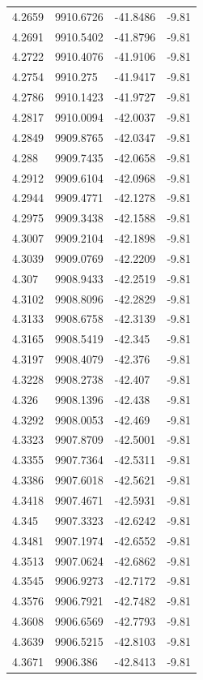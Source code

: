 \begin{table}[H]
\begin{tabular}{llll}
4.2659 & 9910.6726 & -41.8486 & -9.81 \\
4.2691 & 9910.5402 & -41.8796 & -9.81 \\
4.2722 & 9910.4076 & -41.9106 & -9.81 \\
4.2754 & 9910.275 & -41.9417 & -9.81 \\
4.2786 & 9910.1423 & -41.9727 & -9.81 \\
4.2817 & 9910.0094 & -42.0037 & -9.81 \\
4.2849 & 9909.8765 & -42.0347 & -9.81 \\
4.288 & 9909.7435 & -42.0658 & -9.81 \\
4.2912 & 9909.6104 & -42.0968 & -9.81 \\
4.2944 & 9909.4771 & -42.1278 & -9.81 \\
4.2975 & 9909.3438 & -42.1588 & -9.81 \\
4.3007 & 9909.2104 & -42.1898 & -9.81 \\
4.3039 & 9909.0769 & -42.2209 & -9.81 \\
4.307 & 9908.9433 & -42.2519 & -9.81 \\
4.3102 & 9908.8096 & -42.2829 & -9.81 \\
4.3133 & 9908.6758 & -42.3139 & -9.81 \\
4.3165 & 9908.5419 & -42.345 & -9.81 \\
4.3197 & 9908.4079 & -42.376 & -9.81 \\
4.3228 & 9908.2738 & -42.407 & -9.81 \\
4.326 & 9908.1396 & -42.438 & -9.81 \\
4.3292 & 9908.0053 & -42.469 & -9.81 \\
4.3323 & 9907.8709 & -42.5001 & -9.81 \\
4.3355 & 9907.7364 & -42.5311 & -9.81 \\
4.3386 & 9907.6018 & -42.5621 & -9.81 \\
4.3418 & 9907.4671 & -42.5931 & -9.81 \\
4.345 & 9907.3323 & -42.6242 & -9.81 \\
4.3481 & 9907.1974 & -42.6552 & -9.81 \\
4.3513 & 9907.0624 & -42.6862 & -9.81 \\
4.3545 & 9906.9273 & -42.7172 & -9.81 \\
4.3576 & 9906.7921 & -42.7482 & -9.81 \\
4.3608 & 9906.6569 & -42.7793 & -9.81 \\
4.3639 & 9906.5215 & -42.8103 & -9.81 \\
4.3671 & 9906.386 & -42.8413 & -9.81 \\

\end{tabular}
\end{table}

